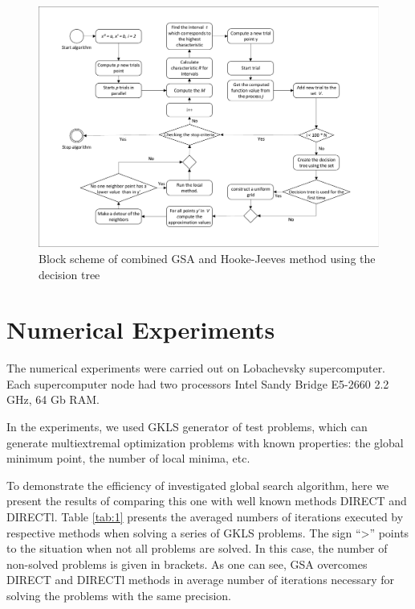 \documentclass{svproc}
\begin{document}
\begin{figure}[ht!]
	
	\begin{center} 
				\begin{minipage}[h]{0.9\linewidth} 			\includegraphics[width=1\linewidth]{figure/fig3.pdf}
					 			\caption{Block scheme of combined GSA and Hooke-Jeeves method using the  decision tree} %
				 \end{minipage}
	\end{center}
\end{figure}





\section{Numerical Experiments}\label{SecR}


The numerical experiments were carried out on Lobachevsky supercomputer. Each supercomputer  node had two processors Intel Sandy Bridge E5-2660 2.2 GHz, 64 Gb RAM. 

In the experiments, we used GKLS generator of test problems, which can generate multiextremal  optimization problems with known properties: the global minimum point, the number of local minima,  etc.

To demonstrate the efficiency of  investigated global search algorithm, here we present the results of  comparing this one with well known methods DIRECT and DIRECTl. Table \ref{tab:1} presents the averaged numbers of iterations executed by respective methods when  solving a series of GKLS problems. The sign ``>'' points to the situation when not all problems are  solved. In this case, the number of non-solved problems is given in brackets. As one can see,  GSA overcomes DIRECT and DIRECTl methods in average number of iterations necessary for solving the problems with the same precision.
\end{document}
